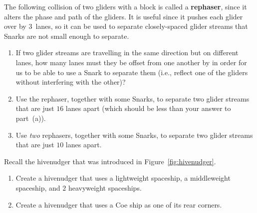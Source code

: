 \begin{multicols}{2}
	
	\begin{problem}\label{exer:rephaser} 
		The following collision of two gliders with a block is called a \textbf{rephaser}, since it alters the phase and path of the gliders. It is useful since it pushes each glider over by $3$~lanes, so it can be used to separate closely-spaced glider streams that Snarks are not small enough to separate.
		
		\begin{center}
		\end{center}
		
		\begin{enumerate}[label=\bf\color{ocre}(\alph*)]
			\item If two glider streams are travelling in the same direction but on different lanes, how many lanes must they be offset from one another by in order for us to be able to use a Snark to separate them (i.e., reflect one of the gliders without interfering with the other)?
			
			\item Use the rephaser, together with some Snarks, to separate two glider streams that are just $16$ lanes apart (which should be less than your answer to part~(a)).
			
			\item Use \emph{two} rephasers, together with some Snarks, to separate two glider streams that are just $10$ lanes apart.
		\end{enumerate}
	\end{problem}
	
	
	\mfilbreak
	
	
	\begin{problem}\label{exer:hivenudger_modify}
		Recall the hivenudger that was introduced in Figure~\ref{fig:hivenudger}.\smallskip
		
		\begin{enumerate}[label=\bf\color{ocre}(\alph*)]
			\item {} Create a hivenudger that uses a lightweight spaceship, a middleweight spaceship, and $2$ heavyweight spaceships.
			
			\item {} Create a hivenudger that uses a Coe ship as one of its rear corners.
			

\end{enumerate}
\end{problem}
\end{multicols}
